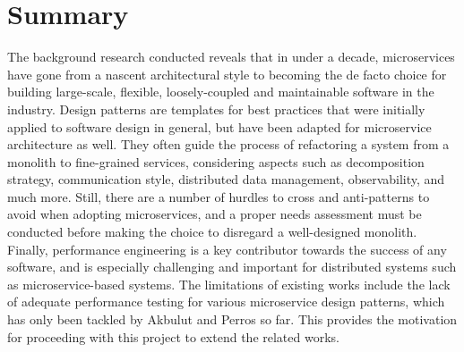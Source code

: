 \section{Summary}

The background research conducted reveals that in under a decade, microservices have gone from a nascent architectural style to becoming the de facto choice for building large-scale, flexible, loosely-coupled and maintainable software in the industry. Design patterns are templates for best practices that were initially applied to software design in general, but have been adapted for microservice architecture as well. They often guide the process of refactoring a system from a monolith to
fine-grained services, considering aspects such as decomposition strategy, communication style, distributed data management, observability, and much more. Still, there are a number of hurdles to cross and anti-patterns to avoid when adopting microservices, and a proper needs assessment must be conducted before making the choice to disregard a well-designed monolith. Finally, performance engineering is a key contributor towards the success of any software, and is especially challenging and
important for distributed systems such as microservice-based systems. The limitations of existing works include the lack of adequate performance testing for various microservice design patterns, which has only been tackled by Akbulut and Perros \cite{akbulut19} so far. This provides the motivation for proceeding with this project to extend the related works.
